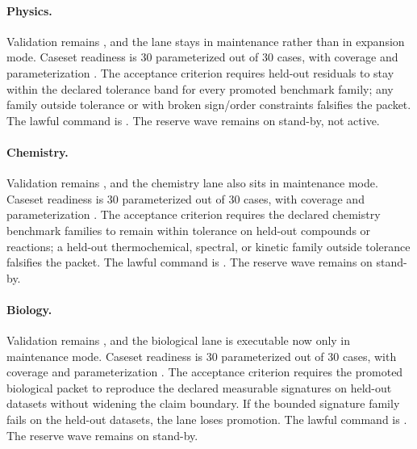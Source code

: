\paragraph{Physics.}
Validation remains , and the lane stays in maintenance rather than
in expansion mode. Caseset readiness is 30 parameterized out of 30 cases, with
coverage  and parameterization
. The acceptance criterion requires
held-out residuals to stay within the declared tolerance band for every
promoted benchmark family; any family outside tolerance or with broken
sign/order constraints falsifies the packet. The lawful command is
. The reserve wave
 remains on stand-by, not active.

\paragraph{Chemistry.}
Validation remains , and the chemistry lane also sits in
maintenance mode. Caseset readiness is 30 parameterized out of 30 cases, with
coverage  and parameterization
. The acceptance criterion requires
the declared chemistry benchmark families to remain within tolerance on
held-out compounds or reactions; a held-out thermochemical, spectral, or
kinetic family outside tolerance falsifies the packet. The lawful command is
. The reserve wave
 remains on stand-by.

\paragraph{Biology.}
Validation remains , and the biological lane is executable now
only in maintenance mode. Caseset readiness is 30 parameterized out of 30
cases, with coverage  and parameterization
. The acceptance criterion requires
the promoted biological packet to reproduce the declared measurable signatures
on held-out datasets without widening the claim boundary. If the bounded
signature family fails on the held-out datasets, the lane loses promotion. The
lawful command is
. The reserve wave
 remains on stand-by.

